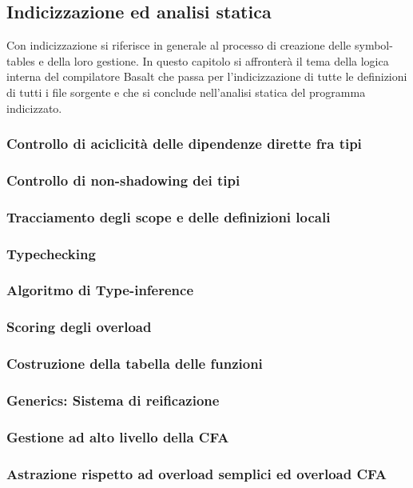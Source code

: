 \subsection{Indicizzazione ed analisi statica}
Con indicizzazione si riferisce in generale al processo di creazione delle symbol-tables
e della loro gestione. In questo capitolo si affronterà il tema della logica interna 
del compilatore Basalt che passa per l'indicizzazione di tutte le definizioni di tutti i file 
sorgente e che si conclude nell'analisi statica del programma indicizzato. \\


\newpage


\newpage

\subsubsection{Controllo di aciclicità delle dipendenze dirette fra tipi}
\subsubsection{Controllo di non-shadowing dei tipi}
\subsubsection{Tracciamento degli scope e delle definizioni locali}
\subsubsection{Typechecking}
\subsubsection{Algoritmo di Type-inference}
\subsubsection{Scoring degli overload}
\subsubsection{Costruzione della tabella delle funzioni}
\subsubsection{Generics: Sistema di reificazione}
\subsubsection{Gestione ad alto livello della CFA}
\subsubsection{Astrazione rispetto ad overload semplici ed overload CFA}
